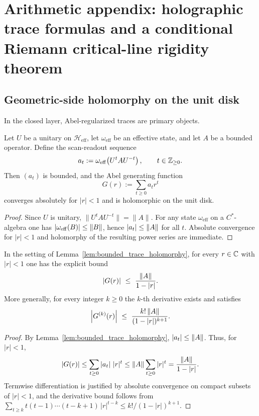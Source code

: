 
\section{Arithmetic appendix: holographic trace formulas and a conditional Riemann critical-line rigidity theorem}
\label{app:trace_rigidity}

\subsection{Geometric-side holomorphy on the unit disk}
\label{sec:geom_holomorphy}

In the closed layer, Abel-regularized traces are primary objects.
\begin{lemma}
\label{lem:bounded_trace_holomorphy}
Let $U$ be a unitary on $\mathcal{H}_{\mathrm{eff}}$, let $\omega_{\mathrm{eff}}$ be an effective state, and let $A$ be a bounded operator.
Define the scan-readout sequence
\[
a_t:=\omega_{\mathrm{eff}}\!\left(U^t A U^{-t}\right),\qquad t\in\mathbb{Z}_{\ge 0}.
\]
Then $(a_t)$ is bounded, and the Abel generating function
\[
G(r):=\sum_{t\ge 0} a_t r^t
\]
converges absolutely for $|r|<1$ and is holomorphic on the unit disk.
\end{lemma}

\begin{proof}
Since $U$ is unitary, $\|U^t A U^{-t}\|=\|A\|$.
For any state $\omega_{\mathrm{eff}}$ on a $C^\ast$-algebra one has $\left\lvert \omega_{\mathrm{eff}}(B)\right\rvert\le \|B\|$, hence $\left\lvert a_t\right\rvert\le \|A\|$ for all $t$.
Absolute convergence for $|r|<1$ and holomorphy of the resulting power series are immediate.
\end{proof}

\begin{corollary}
\label{cor:geom_growth_bounds}
In the setting of Lemma~\ref{lem:bounded_trace_holomorphy}, for every $r\in\mathbb{C}$ with $|r|<1$ one has the explicit bound
\begin{equation}
\label{eq:geom_growth_bound}
\left\lvert G(r)\right\rvert\ \le\ \frac{\|A\|}{1-|r|}.
\end{equation}
More generally, for every integer $k\ge 0$ the $k$-th derivative exists and satisfies
\[
\abs{G^{(k)}(r)}\ \le\ \frac{k!\,\|A\|}{(1-|r|)^{k+1}}.
\]
\end{corollary}

\begin{proof}
By Lemma~\ref{lem:bounded_trace_holomorphy}, $\left\lvert a_t\right\rvert\le \|A\|$.
Thus, for $|r|<1$,
\[
\left\lvert G(r)\right\rvert\le \sum_{t\ge 0}\left\lvert a_t\right\rvert\,|r|^t\le \|A\|\sum_{t\ge 0}|r|^t=\frac{\|A\|}{1-|r|}.
\]
Termwise differentiation is justified by absolute convergence on compact subsets of $|r|<1$, and the derivative bound follows from $\sum_{t\ge k} t(t-1)\cdots(t-k+1)\,|r|^{t-k}\le k!/(1-|r|)^{k+1}$.
\end{proof}

